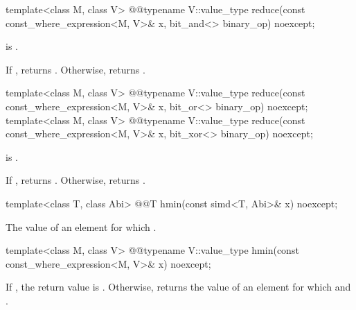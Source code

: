 \begin{itemdecl}
template<class M, class V>
  @@typename V::value_type reduce(const const_where_expression<M, V>& x, bit_and<> binary_op) noexcept;
\end{itemdecl}

\begin{itemdescr}
  \pnum\requires
   is .

  \pnum\returns
  If , returns . Otherwise, returns  \forallmaskedi.
\end{itemdescr}

\begin{itemdecl}
template<class M, class V>
  @@typename V::value_type reduce(const const_where_expression<M, V>& x, bit_or<> binary_op) noexcept;
template<class M, class V>
  @@typename V::value_type reduce(const const_where_expression<M, V>& x, bit_xor<> binary_op) noexcept;
\end{itemdecl}

\begin{itemdescr}
  \pnum\requires
   is .

  \pnum\returns
  If , returns . Otherwise, returns  \forallmaskedi.
\end{itemdescr}

\begin{itemdecl}
template<class T, class Abi> @@T hmin(const simd<T, Abi>& x) noexcept;
\end{itemdecl}

\begin{itemdescr}
  \pnum\returns
  The value of an element  for which  \foralli.
\end{itemdescr}

\begin{itemdecl}
template<class M, class V> @@typename V::value_type hmin(const const_where_expression<M, V>& x) noexcept;
\end{itemdecl}

\begin{itemdescr}
  \pnum\returns
  If , the return value is . Otherwise, returns the value of an element  for which  and  \forallmaskedi.
\end{itemdescr}

